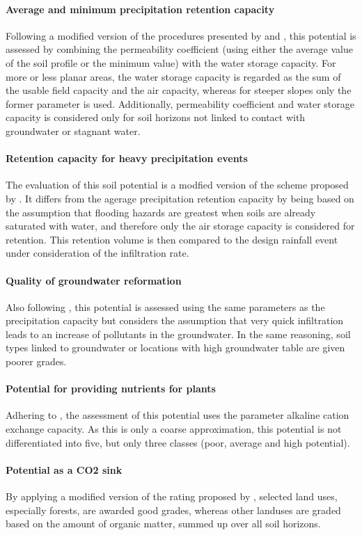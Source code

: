 \documentclass[soilsystems,article,submit,moreauthors,pdftex,10pt,a4paper]{Definitions/mdpi}
\begin{document}
\paragraph{Average and minimum precipitation retention capacity}
Following a modified version of the procedures presented by \cite{LUBW1995} and \cite{BAYGLA2003}, this potential is assessed by combining the permeability coefficient (using either the average value of the soil profile or the minimum value) with the water storage capacity. For more or less planar areas, the water storage capacity is regarded as  the sum of the usable field capacity and the air capacity, whereas for steeper slopes only the former parameter is used. Additionally, permeability coefficient and water storage capacity is considered only for soil horizons not linked to contact with groundwater or stagnant water.
\paragraph{Retention capacity for heavy precipitation events}
 The evaluation of this soil potential is a modfied version of the scheme proposed by \citep{Lehmann2008}. It differs from the agerage precipitation retention capacity by being based on the assumption that flooding hazards are greatest when soils are already saturated with water, and therefore only the air storage capacity is considered for retention. This retention volume is then compared to the design rainfall event under consideration of the infiltration rate.
\paragraph{Quality of groundwater reformation}
Also following \citep{Lehmann2008}, this potential is assessed using the same parameters as the precipitation capacity but considers the assumption that very quick infiltration leads to an increase of pollutants in the groundwater. In the same reasoning, soil types linked to groundwater or locations with high groundwater table are given poorer grades.
\paragraph{Potential for providing nutrients for plants}
Adhering to \citep{Mueller2011}, the assessment of this potential uses the parameter alkaline cation exchange capacity. As this is only a coarse approximation, this potential is not differentiated into five, but only three classes (poor, average and high potential).
\paragraph{Potential as a CO2 sink}
By applying a modified version of the rating proposed by \cite{Gerstenberg2005}, selected land uses, especially forests, are awarded good grades, whereas other landuses are graded based on the amount of organic matter, summed up over all soil horizons.
\end{document}
